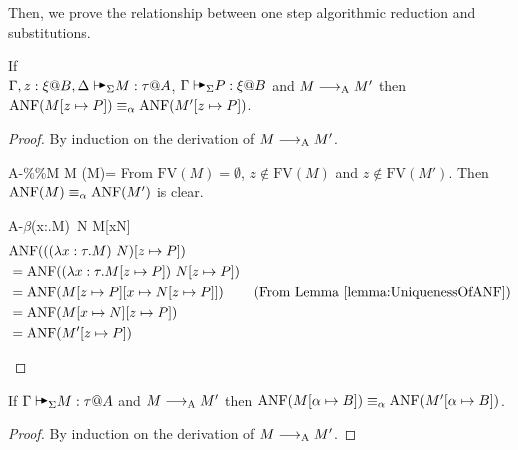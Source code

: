 Then, we prove the relationship between one step algorithmic reduction and substitutions.

\begin{lemma}
    \label{lemma:AlgorithmicReductionAndTermSubstitution}
    If \\ \( \G, z:\xi@B, \D \AVS M : \tau @ A \), \( \G \AVS P : \xi @ B \) and \( M \longrightarrow_{\text{A}} M' \) then \\
    \( \text{ANF}(M[z\mapsto P]) \equiv_\alpha \text{ANF}(M'[z\mapsto P]) \).
\end{lemma}

\begin{proof}
    By induction on the derivation of \( M \longrightarrow_{\text{A}} M' \).
    \begin{rneqncase}{\textsc{A-\%}}{\%M \RA M  (M)=\emptyset}
        From \( \text{FV}(M)=\emptyset \), \( z \notin \text{FV}(M) \) and \( z \notin \text{FV}(M') \).
        Then \( \text{ANF}(M) \equiv_\alpha \text{ANF}(M') \) is clear.
    \end{rneqncase}

    \begin{rneqncase}{\textsc{A-$\beta$}}{(\lambda x:\tau.M)\ N \RA M[x\mapsto N]}
        \begin{align*}
            & \text{ANF}(((\lambda x:\tau.M)\ N)[z \mapsto P]) \\
            & = \text{ANF}((\lambda x:\tau.M[z \mapsto P])\ N[z \mapsto P]) \\
            & = \text{ANF}(M[z \mapsto P][x \mapsto N[z \mapsto P]]) & (\text{From Lemma } \ref{lemma:UniquenessOfANF}) \\
            & = \text{ANF}(M[x \mapsto N][z \mapsto P]) \\
            & = \text{ANF}(M'[z \mapsto P])
        \end{align*}
    \end{rneqncase}
\end{proof}

\begin{lemma}
    \label{lemma:AlgorithmicReductionAndStageSubstitution}
    If \( \G \AVS M : \tau @ A \) and \( M \longrightarrow_{\text{A}} M' \) then
    \( \text{ANF}(M[\alpha \mapsto B]) \equiv_\alpha \text{ANF}(M'[\alpha \mapsto B]) \).
\end{lemma}

\begin{proof}
    By induction on the derivation of \( M \longrightarrow_{\text{A}} M' \).
\end{proof}

